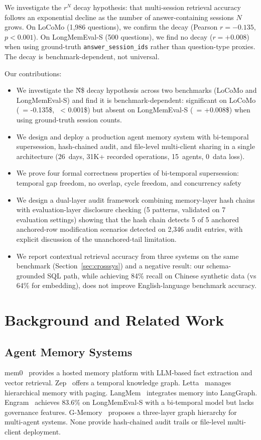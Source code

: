 \documentclass{article}
\begin{document}
We investigate the $r^N$ decay hypothesis: that multi-session retrieval accuracy follows an exponential decline as the number of answer-containing sessions $N$ grows. On LoCoMo (1{,}986 questions), we confirm the decay (Pearson $r = -0.135$, $p < 0.001$). On LongMemEval-S (500 questions), we find no decay ($r = +0.008$) when using ground-truth \texttt{answer\_session\_ids} rather than question-type proxies. The decay is benchmark-dependent, not universal.

Our contributions:
\begin{itemize}
\item We investigate the \^N\$ decay hypothesis across two benchmarks (LoCoMo and LongMemEval-S) and find it is benchmark-dependent: significant on LoCoMo (\ = -0.135\$, \ < 0.001\$) but absent on LongMemEval-S (\ = +0.008\$) when using ground-truth session counts.
\item We design and deploy a production agent memory system with bi-temporal supersession, hash-chained audit, and file-level multi-client sharing in a single architecture (26~days, 31K+ recorded operations, 15~agents, 0~data loss).
\item We prove four formal correctness properties of bi-temporal supersession: temporal gap freedom, no overlap, cycle freedom, and concurrency safety
\item We design a dual-layer audit framework combining memory-layer hash chains with evaluation-layer disclosure checking (5 patterns, validated on 7 evaluation settings) showing that the hash chain detects 5 of 5 anchored anchored-row modification scenarios detected on 2{,}346 audit entries, with explicit discussion of the unanchored-tail limitation.
\item We report contextual retrieval accuracy from three systems on the same benchmark (Section~\ref{sec:crosssys}) and a negative result: our schema-grounded SQL path, while achieving 84\% recall on Chinese synthetic data (vs 64\% for embedding), does not improve English-language benchmark accuracy.
\end{itemize}

\section{Background and Related Work}
\label{sec:related}

\subsection{Agent Memory Systems}
mem0~\citep{mem0} provides a hosted memory platform with LLM-based fact extraction and vector retrieval. Zep~\citep{zep} offers a temporal knowledge graph. Letta~\citep{letta} manages hierarchical memory with paging. LangMem~\citep{langmem} integrates memory into LangGraph. Engram~\citep{engram} achieves 83.6\% on LongMemEval-S with a bi-temporal model but lacks governance features. G-Memory~\citep{gmotion} proposes a three-layer graph hierarchy for multi-agent systems. None provide hash-chained audit trails or file-level multi-client deployment.
\end{document}
